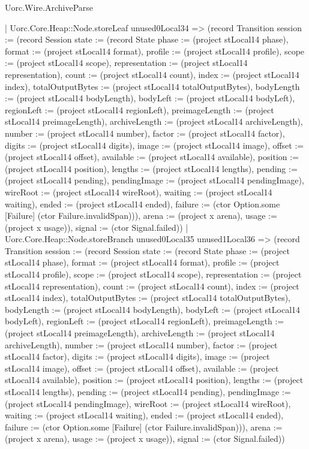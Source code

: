 \begin{lexlean}{Uorc.Wire.ArchiveParse}
\begin{semanticmodule}
{            | Uorc.Core.Heap::Node.storeLeaf unused0Local34 => (record Transition {session := (record Session {state := (record State {phase := (project stLocal14 phase), format := (project stLocal14 format), profile := (project stLocal14 profile), scope := (project stLocal14 scope), representation := (project stLocal14 representation), count := (project stLocal14 count), index := (project stLocal14 index), totalOutputBytes := (project stLocal14 totalOutputBytes), bodyLength := (project stLocal14 bodyLength), bodyLeft := (project stLocal14 bodyLeft), regionLeft := (project stLocal14 regionLeft), preimageLength := (project stLocal14 preimageLength), archiveLength := (project stLocal14 archiveLength), number := (project stLocal14 number), factor := (project stLocal14 factor), digits := (project stLocal14 digits), image := (project stLocal14 image), offset := (project stLocal14 offset), available := (project stLocal14 available), position := (project stLocal14 position), lengths := (project stLocal14 lengths), pending := (project stLocal14 pending), pendingImage := (project stLocal14 pendingImage), wireRoot := (project stLocal14 wireRoot), waiting := (project stLocal14 waiting), ended := (project stLocal14 ended), failure := (ctor Option.some [Failure] (ctor Failure.invalidSpan))}), arena := (project x arena), usage := (project x usage)}), signal := (ctor Signal.failed)})
            | Uorc.Core.Heap::Node.storeBranch unused0Local35 unused1Local36 => (record Transition {session := (record Session {state := (record State {phase := (project stLocal14 phase), format := (project stLocal14 format), profile := (project stLocal14 profile), scope := (project stLocal14 scope), representation := (project stLocal14 representation), count := (project stLocal14 count), index := (project stLocal14 index), totalOutputBytes := (project stLocal14 totalOutputBytes), bodyLength := (project stLocal14 bodyLength), bodyLeft := (project stLocal14 bodyLeft), regionLeft := (project stLocal14 regionLeft), preimageLength := (project stLocal14 preimageLength), archiveLength := (project stLocal14 archiveLength), number := (project stLocal14 number), factor := (project stLocal14 factor), digits := (project stLocal14 digits), image := (project stLocal14 image), offset := (project stLocal14 offset), available := (project stLocal14 available), position := (project stLocal14 position), lengths := (project stLocal14 lengths), pending := (project stLocal14 pending), pendingImage := (project stLocal14 pendingImage), wireRoot := (project stLocal14 wireRoot), waiting := (project stLocal14 waiting), ended := (project stLocal14 ended), failure := (ctor Option.some [Failure] (ctor Failure.invalidSpan))}), arena := (project x arena), usage := (project x usage)}), signal := (ctor Signal.failed)})
}
\end{semanticmodule}
\end{lexlean}

